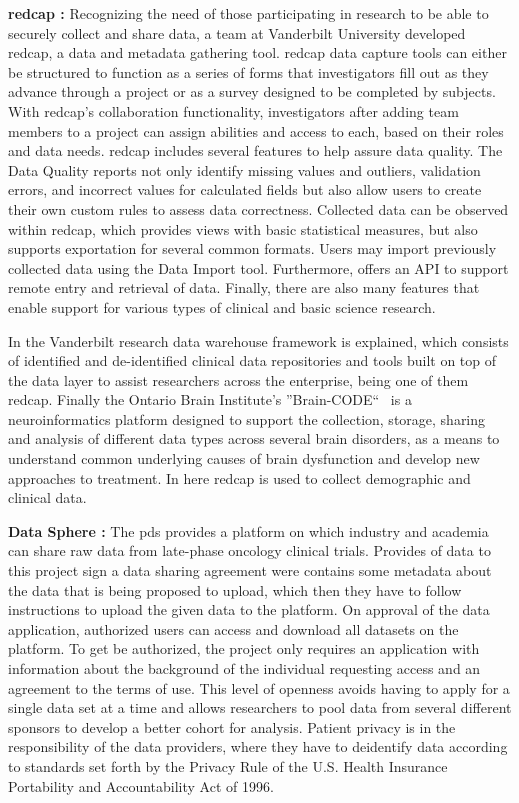 \textbf{\gls{redcap} \cite{redcap}:}
Recognizing the need of those participating in research to be able to securely collect
and share data, a team at Vanderbilt University developed \gls{redcap}, a data and
metadata gathering tool.
\gls{redcap} data capture tools can either be structured to function as a series of
forms that investigators fill out as they advance through a project or as a survey
designed to be completed by subjects.
With \gls{redcap}'s collaboration functionality, investigators after adding team
members to a project can assign abilities and access to each, based on their roles and
data needs.
\gls{redcap} includes several features to help assure data quality.
The Data Quality reports not only identify missing values and outliers, validation
errors, and incorrect values for calculated fields but also allow users to create their
own custom rules to assess data correctness.
Collected data can be observed within \gls{redcap}, which provides views with basic
statistical measures, but also supports exportation for several common formats.
Users may import previously collected data using the Data Import tool.
Furthermore, offers an API to support remote entry and retrieval of data.
Finally, there are also many features that enable support for various types of clinical and
basic science research.

In \cite{vanderbilt} the Vanderbilt research data warehouse framework is explained,
which consists of identified and de-identified clinical data repositories and tools
built on top of the data layer to assist researchers across the enterprise, being one
of them \gls{redcap}.
Finally the Ontario Brain Institute’s ''Brain-CODE``~\cite{braincode} is a
neuroinformatics platform designed to support the collection, storage, sharing and
analysis of different data types across several brain disorders, as a means to
understand common underlying causes of brain dysfunction and develop new approaches to
treatment.
In here \gls{redcap} is used to collect demographic and clinical data.

\textbf{Data Sphere \cite{datasphere}:}
The \gls{pds} provides a platform on which industry and academia can share
raw data from late-phase oncology clinical trials.
Provides of data to this project sign a data sharing agreement were contains some
metadata about the data that is being proposed to upload, which then they have to
follow instructions to upload the given data to the platform.
On approval of the data application, authorized users can access and download all
datasets on the platform.
To get be authorized, the project only requires an application with information about
the background of the individual requesting access and an agreement to the terms of
use.
This level of openness avoids having to apply for a single data set at a time and
allows researchers to pool data from several different sponsors to develop a better
cohort for analysis.
Patient privacy is in the responsibility of the data providers, where they have to
deidentify data according to standards set forth by the Privacy Rule of the U.S. Health
Insurance Portability and Accountability Act of 1996.

